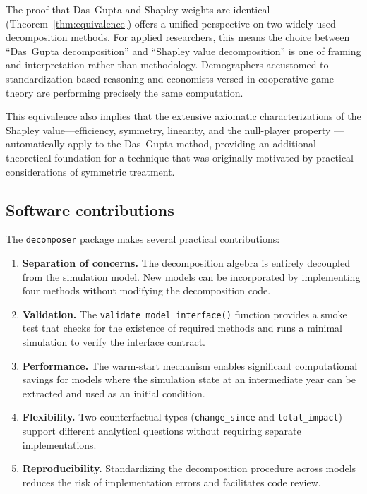 \documentclass[11pt]{article}
\newcommand{\pkg}[1]{\texttt{#1}}
\newcommand{\code}[1]{\texttt{#1}}
\begin{document}
The proof that Das~Gupta and Shapley weights are identical
(Theorem~\ref{thm:equivalence}) offers a unified perspective on two
widely used decomposition methods.
For applied researchers, this means the choice between ``Das~Gupta
decomposition'' and ``Shapley value decomposition'' is one of framing
and interpretation rather than methodology.
Demographers accustomed to standardization-based reasoning and
economists versed in cooperative game theory are performing precisely
the same computation.

This equivalence also implies that the extensive axiomatic
characterizations of the Shapley value---efficiency, symmetry,
linearity, and the null-player property
\citep{shapley1953value}---automatically apply to the Das~Gupta method,
providing an additional theoretical foundation for a technique that was
originally motivated by practical considerations of symmetric treatment.

\subsection{Software contributions}

The \pkg{decomposer} package makes several practical contributions:

\begin{enumerate}
  \item \textbf{Separation of concerns.}
    The decomposition algebra is entirely decoupled from the simulation
    model.
    New models can be incorporated by implementing four methods without
    modifying the decomposition code.

  \item \textbf{Validation.}
    The \code{validate\_model\_interface()} function provides a
    smoke test that checks for the existence of required methods and
    runs a minimal simulation to verify the interface contract.

  \item \textbf{Performance.}
    The warm-start mechanism enables significant computational savings
    for models where the simulation state at an intermediate year can
    be extracted and used as an initial condition.

  \item \textbf{Flexibility.}
    Two counterfactual types (\code{change\_since} and
    \code{total\_impact}) support different analytical questions without
    requiring separate implementations.

  \item \textbf{Reproducibility.}
    Standardizing the decomposition procedure across models reduces the
    risk of implementation errors and facilitates code review.
\end{enumerate}
\end{document}
